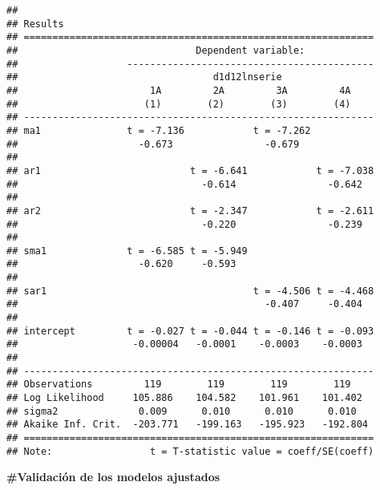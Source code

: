 \documentclass[
]{article}
\begin{document}
\begin{verbatim}
## 
## Results
## =============================================================
##                               Dependent variable:            
##                   -------------------------------------------
##                                  d1d12lnserie                
##                       1A         2A         3A         4A    
##                      (1)        (2)        (3)        (4)    
## -------------------------------------------------------------
## ma1               t = -7.136            t = -7.262           
##                     -0.673                -0.679             
##                                                              
## ar1                          t = -6.641            t = -7.038
##                                -0.614                -0.642  
##                                                              
## ar2                          t = -2.347            t = -2.611
##                                -0.220                -0.239  
##                                                              
## sma1              t = -6.585 t = -5.949                      
##                     -0.620     -0.593                        
##                                                              
## sar1                                    t = -4.506 t = -4.468
##                                           -0.407     -0.404  
##                                                              
## intercept         t = -0.027 t = -0.044 t = -0.146 t = -0.093
##                    -0.00004   -0.0001    -0.0003    -0.0003  
##                                                              
## -------------------------------------------------------------
## Observations         119        119        119        119    
## Log Likelihood     105.886    104.582    101.961    101.402  
## sigma2              0.009      0.010      0.010      0.010   
## Akaike Inf. Crit.  -203.771   -199.163   -195.923   -192.804 
## =============================================================
## Note:                 t = T-statistic value = coeff/SE(coeff)
\end{verbatim}

\textbf{\#Validación de los modelos ajustados}
\end{document}
